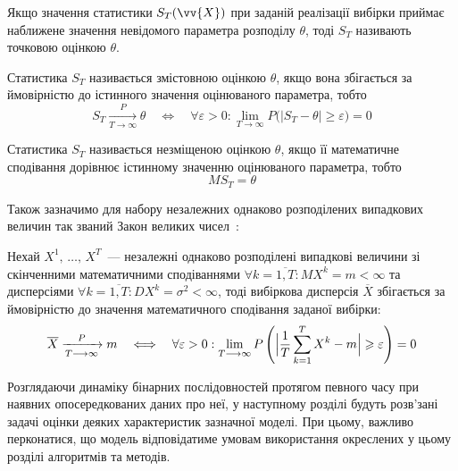 Якщо значення статистики $S_T(\vv{X})$ при заданій реалізації вибірки приймає наближене значення невідомого параметра розподілу $\theta$, тоді $S_T$ називають точковою оцінкою $\theta$. 

\begin{definition}
    Статистика $S_T$ називається змістовною оцінкою $\theta$, якщо вона збігається за ймовірністю до істинного значення оцінюваного параметра, тобто 
    \begin{equation*}
        S_T \xrightarrow[T \longrightarrow \infty]{P} \theta \quad \Longleftrightarrow \quad \forall \varepsilon > 0 : \lim\limits_{T \longrightarrow \infty} P\bigl( |S_T - \theta| \geqslant \varepsilon \bigr) = 0
    \end{equation*}
\end{definition}

\begin{definition}
    Статистика $S_T$ називається незміщеною оцінкою $\theta$, якщо її математичне сподівання дорівнює істинному значенню оцінюваного параметра, тобто
    \begin{equation*}
        MS_T = \theta
    \end{equation*}
\end{definition}

Також зазначимо для набору незалежних однаково розподілених випадкових величин так званий Закон великих чисел~\cite{Larsen2017}:

\begin{theorem}
    Нехай $X^1,\,\ldots,\,X^T$~--- незалежні однаково розподілені випадкові величини зі скінченними математичними сподіваннями $\forall k=\overline{1,T} : MX^k=m<\infty$ та дисперсіями $\forall k=\overline{1,T} : DX^k=\sigma^2<\infty$, тоді вибіркова дисперсія $\overline{X}$ збігається за ймовірністю до значення математичного сподівання заданої вибірки:
    \begin{equation*}
        \overline{X} \xrightarrow[T \longrightarrow \infty]{P} m \quad \Longleftrightarrow \quad \forall \varepsilon > 0 : \lim\limits_{T \longrightarrow \infty} P\left( \Bigl| \frac{1}{T}\sum\limits_{k=1}^{T} X^k - m \Bigr| \geqslant \varepsilon \right) = 0
    \end{equation*}
\end{theorem}

\chapconclude{\ref{chap: review}}

Розглядаючи динаміку бінарних послідовностей протягом певного часу при наявних опосередкованих даних про неї, у наступному розділі будуть розв'зані задачі оцінки деяких характеристик зазначної моделі. При цьому, важливо перконатися, що модель відповідатиме умовам використання окреслених у цьому розділі алгоритмів та методів. 